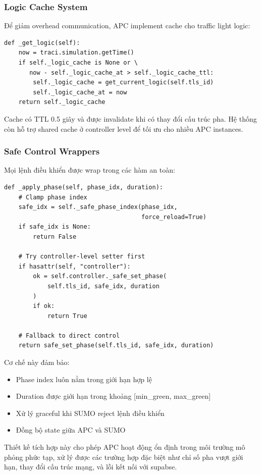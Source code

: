 \documentclass[12pt,a4paper,oneside]{report}
\begin{document}
\subsubsection{Logic Cache System}
Để giảm overhead communication, APC implement cache cho traffic light logic:

\begin{lstlisting}[style=py, caption={Cơ chế cache logic}]
def _get_logic(self):
    now = traci.simulation.getTime()
    if self._logic_cache is None or \
       now - self._logic_cache_at > self._logic_cache_ttl:
        self._logic_cache = get_current_logic(self.tls_id)
        self._logic_cache_at = now
    return self._logic_cache
\end{lstlisting}

Cache có TTL 0.5 giây và được invalidate khi có thay đổi cấu trúc pha. Hệ thống còn hỗ trợ shared cache ở controller level để tối ưu cho nhiều APC instances.

\subsubsection{Safe Control Wrappers}
Mọi lệnh điều khiển được wrap trong các hàm an toàn:

\begin{lstlisting}[style=py, caption={Safe phase control}]
def _apply_phase(self, phase_idx, duration):
    # Clamp phase index
    safe_idx = self._safe_phase_index(phase_idx, 
                                      force_reload=True)
    if safe_idx is None:
        return False
    
    # Try controller-level setter first
    if hasattr(self, "controller"):
        ok = self.controller._safe_set_phase(
            self.tls_id, safe_idx, duration
        )
        if ok:
            return True
            
    # Fallback to direct control
    return safe_set_phase(self.tls_id, safe_idx, duration)
\end{lstlisting}

Cơ chế này đảm bảo:
\begin{itemize}
    \item Phase index luôn nằm trong giới hạn hợp lệ
    \item Duration được giới hạn trong khoảng [min\_green, max\_green]
    \item Xử lý graceful khi SUMO reject lệnh điều khiển
    \item Đồng bộ state giữa APC và SUMO
\end{itemize}
Thiết kế tích hợp này cho phép APC hoạt động ổn định trong môi trường mô phỏng phức tạp, xử lý được các trường hợp đặc biệt như chỉ số pha vượt giới hạn, thay đổi cấu trúc mạng, và lỗi kết nối với supabse.
\end{document}
